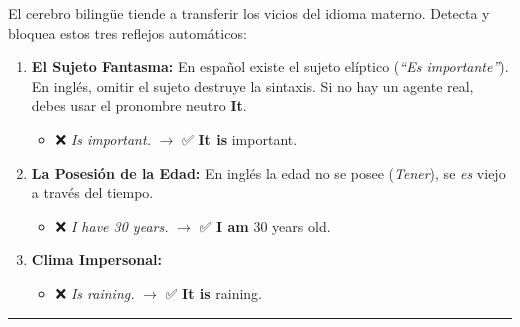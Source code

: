 \documentclass[
  spanish,
  letterpaper,
]{scrbook}
\providecommand{\tightlist}{%
  \setlength{\itemsep}{0pt}\setlength{\parskip}{0pt}}
\begin{document}
\begin{tcolorbox}[enhanced jigsaw, opacityback=0, toptitle=1mm, toprule=.15mm, leftrule=.75mm, colframe=quarto-callout-warning-color-frame, coltitle=black, opacitybacktitle=0.6, rightrule=.15mm, titlerule=0mm, bottomtitle=1mm, arc=.35mm, left=2mm, colback=white, breakable, bottomrule=.15mm, title={⚠️ Error típico del hispanohablante}, colbacktitle=quarto-callout-warning-color!10!white]

El cerebro bilingüe tiende a transferir los vicios del idioma materno.
Detecta y bloquea estos tres reflejos automáticos:

\begin{enumerate}
\def\labelenumi{\arabic{enumi}.}
\tightlist
\item
  \textbf{El Sujeto Fantasma:} En español existe el sujeto elíptico
  (\emph{``Es importante''}). En inglés, omitir el sujeto destruye la
  sintaxis. Si no hay un agente real, debes usar el pronombre neutro
  \textbf{It}.

  \begin{itemize}
  \tightlist
  \item
    ❌ \emph{Is important.} \(\rightarrow\) ✅ \textbf{It is} important.
  \end{itemize}
\item
  \textbf{La Posesión de la Edad:} En inglés la edad no se posee
  (\emph{Tener}), se \emph{es} viejo a través del tiempo.

  \begin{itemize}
  \tightlist
  \item
    ❌ \emph{I have 30 years.} \(\rightarrow\) ✅ \textbf{I am} 30 years
    old.
  \end{itemize}
\item
  \textbf{Clima Impersonal:}

  \begin{itemize}
  \tightlist
  \item
    ❌ \emph{Is raining.} \(\rightarrow\) ✅ \textbf{It is} raining.
  \end{itemize}
\end{enumerate}

\end{tcolorbox}

\begin{center}\rule{0.5\linewidth}{0.5pt}\end{center}
\end{document}

